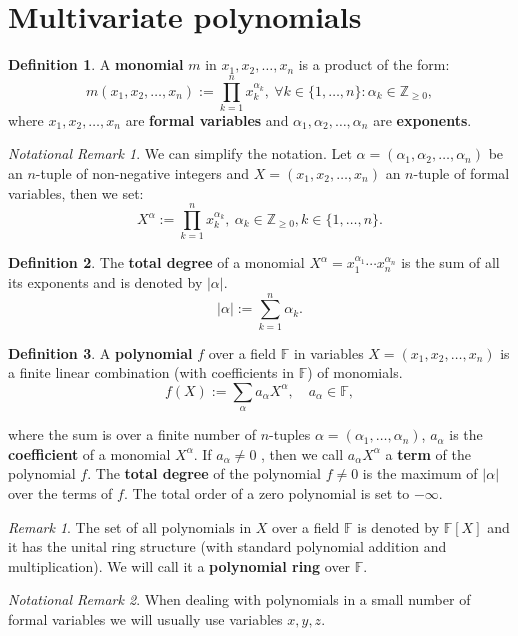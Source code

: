 \documentclass[thesis=M,english]{FITthesis}[2012/10/20]
\theoremstyle{remark}
\newtheorem*{RM}{Remark}
\newtheorem*{NRM}{Notational Remark}
\theoremstyle{definition}
\newtheorem{DF}{Definition}[section]
\begin{document}
\section{Multivariate polynomials}
\begin{DF}
A \textbf{monomial} $m$ in $x_1,x_2,\ldots,x_n$ is a product of the form:
$$
m(x_1,x_2,\ldots,x_n) :=  \prod_{k=1}^nx_k^{\alpha_k},\ \forall k \in \{1, \ldots, n\}: \alpha_k \in\mathbb{Z}_{\geq 0},
$$
where $x_1,x_2,\ldots,x_n$ are \textbf{formal variables} and $\alpha_1,\alpha_2,\ldots,\alpha_n$ are \textbf{exponents}. 
\end{DF}
\begin{NRM} We can simplify the notation. Let $\alpha = (\alpha_1,\alpha_2,\ldots,\alpha_n)$ be an $n$-tuple of non-negative integers and $X = (x_1,x_2,\ldots,x_n)$ an $n$-tuple of formal variables, then we set:
$$
X^\alpha := \prod_{k=1}^nx_k^{\alpha_k},\ \alpha_k \in\mathbb{Z}_{\geq 0}, k \in \{1, \ldots, n\}.
$$
\end{NRM}
\begin{DF}
The \textbf{total degree} of a monomial $X^\alpha=x_1^{\alpha_1}\cdots x_n^{\alpha_n}$ is the sum of all its exponents and is denoted by $|\alpha|$.
$$
|\alpha| := \sum_{k=1}^n \alpha_k.
$$
\end{DF}
\begin{DF}
A \textbf{polynomial}  $f$ over a field $\mathbb{F}$ in variables $X = (x_1,x_2,\ldots,x_n)$ is a finite linear combination (with coefficients in $\mathbb{F}$) of monomials.
$$
f(X) := \sum_{\alpha} a_{\alpha}X^\alpha, \quad a_{\alpha} \in \mathbb{F},
$$
\end{DF}
\noindent where the sum is over a finite number of $n$-tuples $\alpha = (\alpha_1, \ldots, \alpha_n)$, $a_\alpha$ is the \textbf{coefficient} of a monomial $X^\alpha$. If $a_\alpha \neq 0$ , then we call $a_{\alpha}X^\alpha$ a \textbf{term} of the  polynomial $f$. The \textbf{total degree} of the polynomial $f \neq 0$ is the maximum  of $|\alpha |$ over the terms of $f$. The total order of a zero polynomial is set to $-\infty$. 
\begin{RM}
The set of all polynomials in $X$ over a field $\mathbb{F}$ is denoted by $\mathbb{F}[X]$ and it has the unital ring structure (with standard polynomial addition and multiplication). We will call it a \textbf{polynomial ring} over $\mathbb{F}$.
\end{RM}
\begin{NRM}
\noindent When dealing with polynomials in a small number of formal variables we will usually use variables $x,y,z$. 
\end{NRM}
\end{document}
